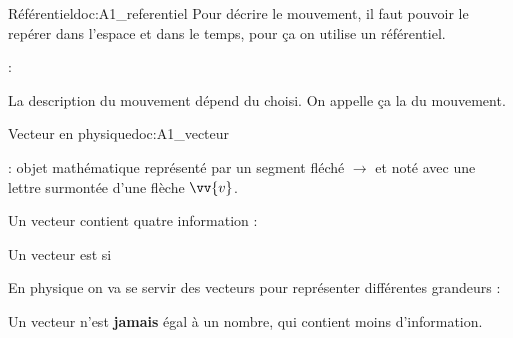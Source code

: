\newpage
\vspace*{-34pt}
\begin{doc}{Référentiel}{doc:A1_referentiel}
  Pour décrire le mouvement, il faut pouvoir le repérer dans l’espace et dans le temps, pour ça on utilise un référentiel.
  
  \begin{importants}
     : 
  \end{importants}
  
  \begin{importants}
    La description du mouvement dépend du  choisi.
    On appelle ça la  du mouvement.
  \end{importants}
\end{doc}



\vspace*{-8pt}
\begin{doc}{Vecteur en physique}{doc:A1_vecteur}
  \begin{importants}
     : objet mathématique représenté par un segment fléché $\longrightarrow$ et noté avec une lettre surmontée d'une flèche $\vv{v}$.
    
    Un vecteur contient quatre information : 
    \begin{multicols}{2}
      \begin{listePoints}
        \item {}
        \item {}
        \item {}
        \item {}
      \end{listePoints}
    \end{multicols}
  
    Un vecteur est  si
  \end{importants}
  
  \fleche En physique on va se servir des vecteurs pour représenter différentes grandeurs :
  
  \attention Un vecteur n'est \textbf{jamais} égal à un nombre, qui contient moins d'information.
\end{doc}

